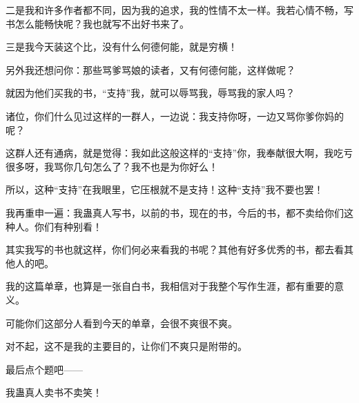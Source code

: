 \begin{this_body}
二是我和许多作者都不同，因为我的追求，我的性情不太一样。我若心情不畅，写书怎么能畅快呢？我也就写不出好书来了。

三是我今天装这个比，没有什么何德何能，就是穷横！

另外我还想问你：那些骂爹骂娘的读者，又有何德何能，这样做呢？

就因为他们买我的书，“支持”我，就可以辱骂我，辱骂我的家人吗？

诸位，你们什么见过这样的一群人，一边说：我支持你呀，一边又骂你爹你妈的呢？

这群人还有通病，就是觉得：我如此这般这样的“支持”你，我奉献很大啊，我吃亏很多呀，我骂你几句怎么了？我不也是为你好么！

所以，这种“支持”在我眼里，它压根就不是支持！这种“支持”我不要也罢！

我再重申一遍：我蛊真人写书，以前的书，现在的书，今后的书，都不卖给你们这种人。你们有种别看！

其实我写的书也就这样，你们何必来看我的书呢？其他有好多优秀的书，都去看其他人的吧。

我的这篇单章，也算是一张自白书，我相信对于我整个写作生涯，都有重要的意义。

可能你们这部分人看到今天的单章，会很不爽很不爽。

对不起，这不是我的主要目的，让你们不爽只是附带的。

最后点个题吧——

我蛊真人卖书不卖笑！

\end{this_body}

